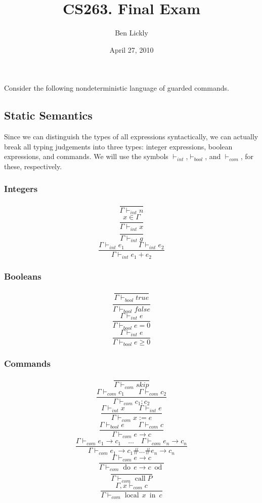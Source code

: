 \documentclass{article}
\title{CS263. Final Exam}
\author{Ben Lickly}
\date{April 27, 2010}
\newcommand{\problem}[1]
{\subsubsection*{} %
\vspace{-16pt} \section{} \vspace{-22pt} \qquad
#1%
\bigskip \bigskip
}
\newcommand{\proves}{\vdash}
\newcommand{\dood}[1]{\operatorname{do}\, #1\ \operatorname{od}}
\newcommand{\callP}{\operatorname{call} P}
\newcommand{\localin}[2]{\operatorname{local}\, #1\ \operatorname{in}\ #2}
\begin{document}
\maketitle

\problem{Consider the following nondeterministic language of guarded commands.
}

\subsection{Static Semantics}

    Since we can distinguish the types of all expressions syntactically, we can
    actually break all typing judgements into three types: integer expressions,
    boolean expressions, and commands.  We will use the symbols
    $\proves_{int}$,$\proves_{bool}$, and $\proves_{com}$, for these,
    respectively.
\subsubsection*{Integers}
\[\frac{}
{\Gamma \proves_{int} n}
\]
\[\frac{x \in \Gamma}
{\Gamma \proves_{int} x}
\]
\[\frac{}
{\Gamma \proves_{int} g}
\]
\[\frac{\Gamma \proves_{int} e_1 \qquad \Gamma \proves_{int} e_2}
{\Gamma \proves_{int} e_1 + e_2}
\]

\subsubsection*{Booleans}
\[\frac{}
{\Gamma \proves_{bool} true}
\]
\[\frac{}
{\Gamma \proves_{bool} false}
\]
\[\frac{\Gamma \proves_{int} e}
{\Gamma \proves_{bool} e = 0}
\]
\[\frac{\Gamma \proves_{int} e}
{\Gamma \proves_{bool} e \ge 0}
\]

\subsubsection*{Commands}
\[\frac{}
{\Gamma \proves_{com} skip}
\]
\[\frac{\Gamma \proves_{com} c_1 \qquad \Gamma \proves_{com} c_2}
{\Gamma \proves_{com} c_1; c_2}
\]
\[\frac{\Gamma \proves_{int} x \qquad \Gamma \proves_{int} e}
{\Gamma \proves_{com} x := e}
\]
\[\frac{\Gamma \proves_{bool} e \qquad \Gamma \proves_{com} c}
{\Gamma \proves_{com} e \rightarrow c}
\]
\[\frac{\Gamma \proves_{com} e_1 \rightarrow c_1 \quad \dots \quad
        \Gamma \proves_{com} e_n \rightarrow c_n}
{\Gamma \proves_{com} e_1 \rightarrow c_1 \# \dots \# e_n \rightarrow c_n}
\]
\[\frac{\Gamma \proves_{com} e \rightarrow c}
{\Gamma \proves_{com} \dood{e \rightarrow c}}
\]
\[\frac{}
{\Gamma \proves_{com} \callP }
\]
\[\frac{\Gamma,x \proves_{com} c}
{\Gamma \proves_{com} \localin{x}{c}}
\]
\end{document}
